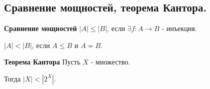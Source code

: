 \subsection{Сравнение мощностей, теорема Кантора.}
\textbf{Сравнение мощностей} $|A| \leq |B|$, если $\exists f : A \to B$ - инъекция.

$|A| < |B|$, если $A \leq B$ и $A \not \sim B$.

\textbf{Теорема Кантора} Пусть $X$ - множество.

Тогда $|X| < |2^X|$.